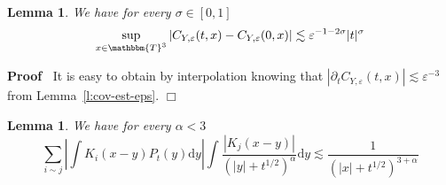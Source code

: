 \documentclass[a4paper,11pt]{article}
\newcommand{\mathd}{\mathrm{d}}
\newenvironment{proof}{\noindent\textbf{Proof\ }}{\hspace*{\fill}$\Box$\medskip}
\newtheorem{lemma}[theorem]{Lemma}
{\theorembodyfont{\rmfamily}\newtheorem{remark}[theorem]{Remark}}
\begin{document}
\begin{lemma}
  \label{l:covar-difference}We have for every $\sigma \in [0, 1]$
  \[ \sup_{x \in \mathbbm{T}^3} | C_{Y, \varepsilon} (t, x) - C_{Y,
     \varepsilon} (0, x) | \lesssim \varepsilon^{- 1 - 2 \sigma} | t
     |^{\sigma} \]
\end{lemma}

\begin{proof}
  It is easy to obtain by interpolation knowing that $| \partial_t C_{Y,
  \varepsilon} (t, x) | \lesssim \varepsilon^{- 3}$ from
  Lemma~\ref{l:cov-est-eps}.
\end{proof}

\begin{lemma}
  \label{l:res-product-1}We have for every $\alpha < 3$
  \[ \sum_{i \sim j} \left| \int K_i (x - y) P_t (y) \mathd y \right|  \int
     \frac{| K_j (x - y) |}{(| y | + t^{1 / 2})^{\alpha}} \mathd y \lesssim
     \frac{1}{(| x | + t^{1 / 2})^{3 + \alpha}} \]
\end{lemma}
\end{document}
